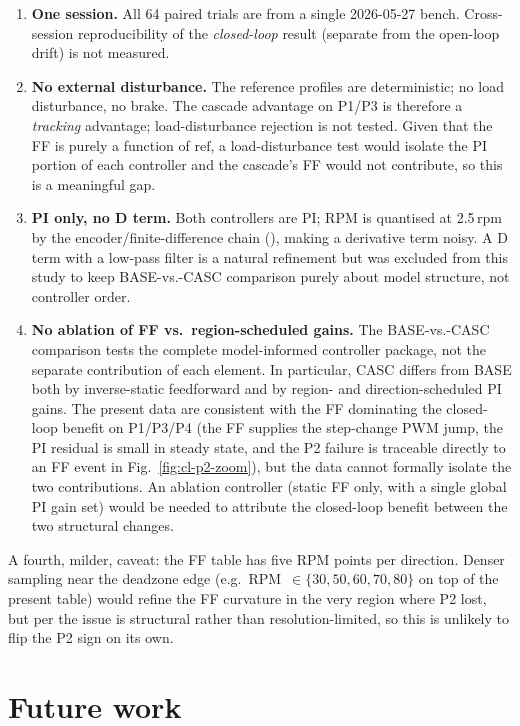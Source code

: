 \begin{enumerate}
  \item \textbf{One session.} All 64 paired trials are from a single 2026-05-27 bench. Cross-session reproducibility of the \emph{closed-loop} result (separate from the open-loop drift) is not measured.
  \item \textbf{No external disturbance.} The reference profiles are deterministic; no load disturbance, no brake. The cascade advantage on P1/P3 is therefore a \emph{tracking} advantage; load-disturbance rejection is not tested. Given that the FF is purely a function of $\text{ref}$, a load-disturbance test would isolate the PI portion of each controller and the cascade's FF would not contribute, so this is a meaningful gap.
  \item \textbf{PI only, no D term.} Both controllers are PI; RPM is quantised at 2.5\,rpm by the encoder/finite-difference chain (), making a derivative term noisy. A D term with a low-pass filter is a natural refinement but was excluded from this study to keep BASE-vs.-CASC comparison purely about model structure, not controller order.
  \item \textbf{No ablation of FF vs.\ region-scheduled gains.} The BASE-vs.-CASC comparison tests the complete model-informed controller package, not the separate contribution of each element. In particular, CASC differs from BASE both by inverse-static feedforward and by region- and direction-scheduled PI gains. The present data are consistent with the FF dominating the closed-loop benefit on P1/P3/P4 (the FF supplies the step-change PWM jump, the PI residual is small in steady state, and the P2 failure is traceable directly to an FF event in Fig.~\ref{fig:cl-p2-zoom}), but the data cannot formally isolate the two contributions. An ablation controller (static FF only, with a single global PI gain set) would be needed to attribute the closed-loop benefit between the two structural changes.
\end{enumerate}

A fourth, milder, caveat: the FF table has five RPM points per direction. Denser sampling near the deadzone edge (e.g.\ RPM~$\in \{30, 50, 60, 70, 80\}$ on top of the present table) would refine the FF curvature in the very region where P2 lost, but per  the issue is structural rather than resolution-limited, so this is unlikely to flip the P2 sign on its own.

\section{Future work}
\label{sec:cl-future}

